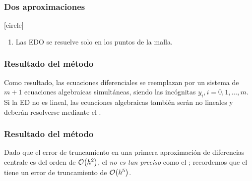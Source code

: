 \begin{frame}
\frametitle{Dos aproximaciones}
[circle]
\begin{enumerate}[<+->]
\conti
\item Las EDO se resuelve solo en los puntos de la malla.
\end{enumerate}
\end{frame}
\begin{frame}
\frametitle{Resultado del método}
Como resultado, las ecuaciones diferenciales se reemplazan por un sistema de $m+1$ ecuaciones algebraicas simultáneas, siendo las incógnitas $y_{i}, i = 0, 1, \ldots, m$. 
\\
\bigskip
Si la ED no es lineal, las ecuaciones algebraicas también serán no lineales y deberán resolverse mediante el .
\end{frame}
\begin{frame}
\frametitle{Resultado del método}
Dado que el error de truncamiento en una primera aproximación de diferencias centrale es del orden de $\order{h^{2}}$, el  \emph{no es tan preciso} como el ; recordemos que el  tiene un error de truncamiento de $\order{h^{5}}$.
\end{frame}
